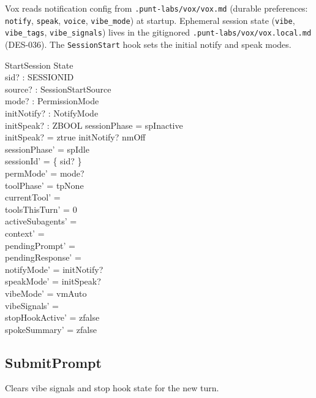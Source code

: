 \documentclass[a4paper,10pt,fleqn]{article}
\begin{document}
Vox reads notification config from \texttt{.punt-labs/vox/vox.md}
(durable preferences: \texttt{notify}, \texttt{speak}, \texttt{voice},
\texttt{vibe\_mode}) at startup. Ephemeral session state
(\texttt{vibe}, \texttt{vibe\_tags}, \texttt{vibe\_signals}) lives in
the gitignored \texttt{.punt-labs/vox/vox.local.md} (DES-036). The
\texttt{SessionStart} hook sets the initial notify and speak modes.

\begin{schema}{StartSession}
  \Delta State \\
  sid? : SESSIONID \\
  source? : SessionStartSource \\
  mode? : PermissionMode \\
  initNotify? : NotifyMode \\
  initSpeak? : ZBOOL
  \where
  sessionPhase = spInactive \\
  initSpeak? = ztrue \implies initNotify? \neq nmOff \\
  sessionPhase' = spIdle \\
  sessionId' = \{ sid? \} \\
  permMode' = mode? \\
  toolPhase' = tpNone \\
  currentTool' = \emptyset \\
  toolsThisTurn' = 0 \\
  activeSubagents' = \emptyset \\
  context' = \langle \rangle \\
  pendingPrompt' = \emptyset \\
  pendingResponse' = \emptyset \\
  notifyMode' = initNotify? \\
  speakMode' = initSpeak? \\
  vibeMode' = vmAuto \\
  vibeSignals' = \emptyset \\
  stopHookActive' = zfalse \\
  spokeSummary' = zfalse
\end{schema}

\subsection{SubmitPrompt}

Clears vibe signals and stop hook state for the new turn.
\end{document}
